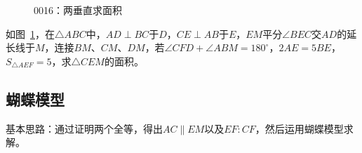 

\begin{figure}[htbp]
  \centering
  \caption{0016：两垂直求面积} \label{fig:0016}
\end{figure}

如图~\ref{fig:0016}，在$\triangle ABC$中，$AD \perp BC$于$D$，$CE \perp AB$于$E$，$EM$平分$\angle BEC$交$AD$的延长线于$M$，连接$BM$、$CM$、$DM$，若$\angle CFD + \angle ABM = 180^\circ$，$2AE = 5BE$，$S_{\triangle AEF} = 5$，求$\triangle CEM$的面积。


\subsection{蝴蝶模型} \label{subsec:0016-butf}

基本思路：通过证明两个全等，得出$AC \parallel EM$以及$EF:CF$，然后运用蝴蝶模型求解。

